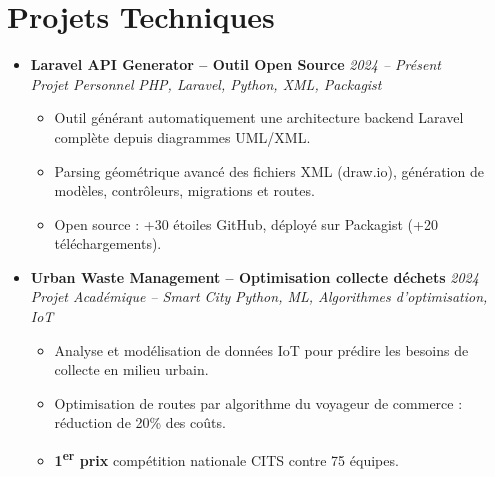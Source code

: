 \documentclass[a4paper,11pt]{article}
\begin{document}
\section{Projets Techniques}
\begin{itemize}[leftmargin=*, label={-}]

\item \textbf{Laravel API Generator -- Outil Open Source} \hfill \textit{2024 -- Présent} \\
\textit{Projet Personnel} \hfill \textit{PHP, Laravel, Python, XML, Packagist}
\vspace{-2pt}
    \begin{itemize}[leftmargin=0.4cm, nosep, label=\tiny$\bullet$]
        \item \small{Outil générant automatiquement une architecture backend Laravel complète depuis diagrammes UML/XML.}
        \item \small{Parsing géométrique avancé des fichiers XML (draw.io), génération de modèles, contrôleurs, migrations et routes.}
        \item \small{Open source : +30 étoiles GitHub, déployé sur Packagist (+20 téléchargements).}
    \end{itemize}
\vspace{3pt}

\item \textbf{Urban Waste Management -- Optimisation collecte déchets} \hfill \textit{2024} \\
\textit{Projet Académique -- Smart City} \hfill \textit{Python, ML, Algorithmes d'optimisation, IoT}
\vspace{-2pt}
    \begin{itemize}[leftmargin=0.4cm, nosep, label=\tiny$\bullet$]
        \item \small{Analyse et modélisation de données IoT pour prédire les besoins de collecte en milieu urbain.}
        \item \small{Optimisation de routes par algorithme du voyageur de commerce : réduction de 20\% des coûts.}
        \item \small{\textbf{1\textsuperscript{er} prix} compétition nationale CITS contre 75 équipes.}
    \end{itemize}
\vspace{3pt}

\end{itemize}

\end{document}
